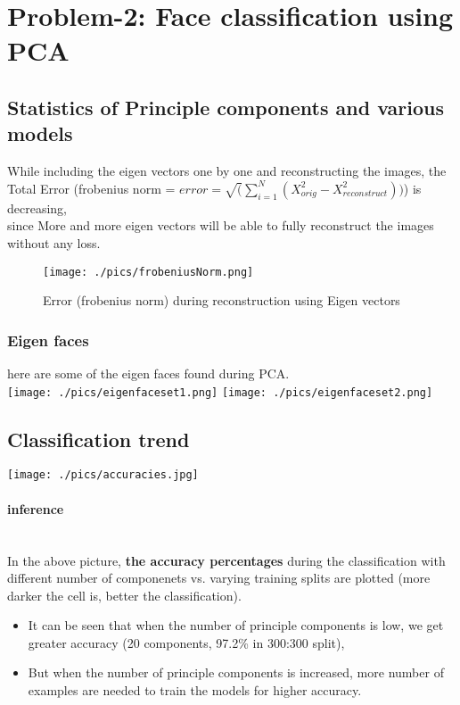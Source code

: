 \documentclass[fleqn]{article}
\newcommand{\myparagraph}[1]{\paragraph{#1}\mbox{}\\}
\begin{document}
\newpage
\section{Problem-2: Face classification using PCA}
\subsection{Statistics of Principle components and various models}
While including the eigen vectors one by one and reconstructing the images, the Total Error (frobenius norm = $error = \sqrt(\sum_{i=1}^N (X_{orig}^2-X_{reconstruct}^2))$) is decreasing, \\
since More and more eigen vectors will be able to fully reconstruct the images without any loss. \\
\begin{figure}[h!]
\caption{Error (frobenius norm) during reconstruction using Eigen vectors}
\texttt{[image: ./pics/frobeniusNorm.png]} \newline
\end{figure}

\subsubsection{Eigen faces}
here are some of the eigen faces found during PCA.\\
\texttt{[image: ./pics/eigenfaceset1.png]} 
\texttt{[image: ./pics/eigenfaceset2.png]} \newline

\subsection{Classification trend}
\texttt{[image: ./pics/accuracies.jpg]} \newline
\myparagraph{inference}
In the above picture, \textbf{the accuracy percentages} during the classification with different number of componenets vs. varying training splits are plotted (more darker the cell is, better the classification).\\
\begin{itemize}
  \item It can be seen that when the number of principle components is low, we get greater accuracy (20 components, 97.2\% in 300:300 split), 
  \item But when the number of principle components is increased, more number of examples are needed to train the models for higher accuracy.\\
\end{itemize}
\end{document}
